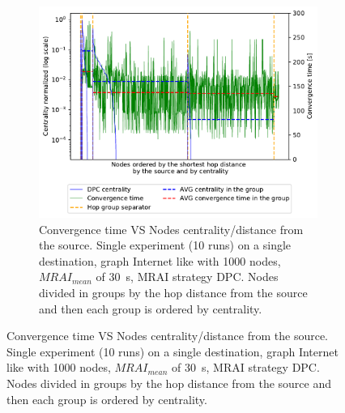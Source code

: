 \documentclass[10pt,conference,letterpaper]{IEEEtran}
\newcommand{\figwidth}{0.78}
\begin{document}
\begin{figure}[tb]
	\centering

	\begin{subfigure}{\columnwidth}
		\centering
		\includegraphics[width=\figwidth\columnwidth]{images/different_destinations/1000-dpc-d0_node-conv_MRAI30_centVStime.pdf}
		\caption{Convergence time VS Nodes centrality/distance from the source.
				 Single experiment (10 runs) on a single destination, graph Internet like with \num{1000} nodes, $MRAI_{mean}$ of \SI{30}{\second},
				 \ac{MRAI} strategy \ac{DPC}. Nodes divided in groups by the hop distance from the source and then each group is
				 ordered by centrality.}
		\label{fig:1000-dpc_node_conv_centVStime_all}
		\qquad
	\end{subfigure}


\end{figure}
\end{document}
